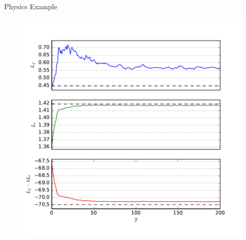 \documentclass[final]{beamer}
\begin{document}
\begin{frame}{}
\begin{textblock}{0.32}
\begin{block}{Physics Example \phantom{p}}
\begin{figure}
\centering
\begin{minipage}{.46\linewidth}
    \centering
        \includegraphics[width=\textwidth]{figures/training.pdf}\vspace{-1em}
\end{minipage}
\hspace{.05\linewidth}
\begin{minipage}{.46\linewidth}
    \centering

\end{minipage}
\end{figure}
\end{block}
\end{textblock}
\end{frame}
\end{document}

